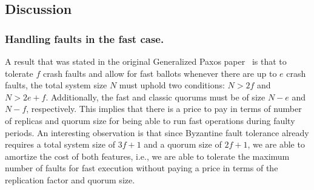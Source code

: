 \subsection{Discussion}

\subsubsection{Handling faults in the fast case.}
A result that was stated in the original Generalized Paxos paper~\cite{Lamport2005} is that to tolerate $f$ crash faults and allow for fast ballots whenever there are up to $e$ crash faults, the total system size $N$ must uphold two conditions: $N > 2f$ and $N > 2e+f$. Additionally, the fast and classic quorums must be of size $N-e$ and $N-f$, respectively. This implies that there is a price to pay in terms of number of replicas and quorum size for being able to run fast operations during faulty periods. An interesting observation is that since Byzantine fault tolerance already requires a total system size of $3f+1$ and a quorum size of $2f+1$, we are able to amortize the cost of both features, i.e., we are able to tolerate the maximum number of faults for fast execution without paying a price in terms of the replication factor and quorum size.

